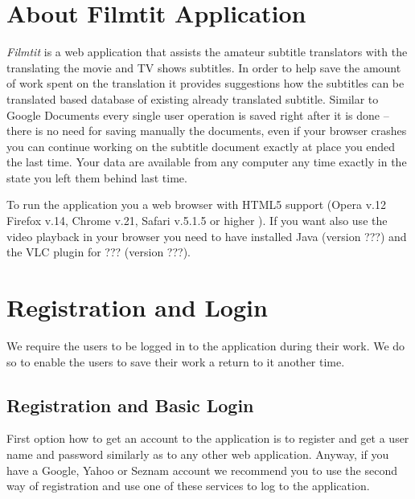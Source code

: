 \label{chap:users_manual}

\section{About Filmtit Application}

\emph{Filmtit} is a web application that assists the amateur subtitle translators with the translating the movie and TV shows subtitles. In order to help save the amount of work spent on the translation it provides suggestions how the subtitles can be translated based database of existing already translated subtitle. Similar to Google Documents every single user operation is saved right after it is done -- there is no need for saving manually the documents, even if your browser crashes you can continue working on the subtitle document exactly at place you ended the last time. Your data are available from any computer any time exactly in the state you left them behind last time.

To run the application you a web browser with HTML5 support (Opera v.12
Firefox v.14, Chrome v.21, Safari v.5.1.5 or higher ). If you want also use the video playback in your browser you need to have installed Java (version ???) and the VLC plugin for ??? (version ???).

\section{Registration and Login}

We require the users to be logged in to the application during their work. We do so to enable the users to save their work a return to it another time. 

\subsection{Registration and Basic Login}

First option how to get an account to the application is to register and get a user name and password similarly as to any other web application. Anyway, if you have a Google, Yahoo or Seznam account we recommend you to use the second way of registration and use one of these services to log to the application.

